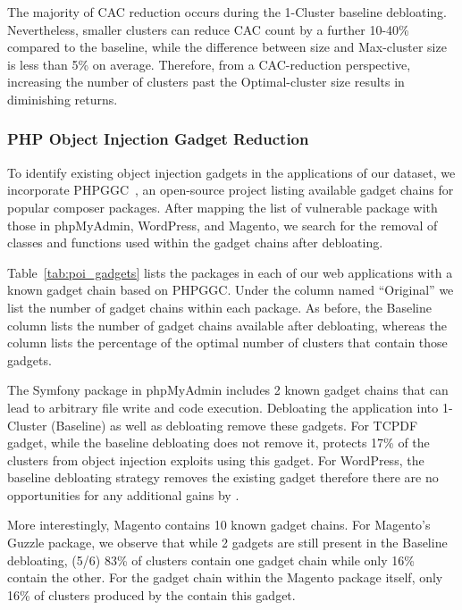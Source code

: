 The majority of CAC reduction occurs during the 1-Cluster baseline debloating. 
Nevertheless, smaller clusters can reduce CAC count by a further 10-40\% compared to the baseline, while the difference between \dbltr{} size and Max-cluster size is less than 5\% on average.
Therefore, from a CAC-reduction perspective, increasing the number of clusters past the Optimal-cluster size results in diminishing returns.

\subsubsection{PHP Object Injection Gadget Reduction}

To identify existing object injection gadgets in the applications of our dataset, we incorporate PHPGGC~\cite{PHPGGC}, an open-source project listing available gadget chains for popular composer packages. 
After mapping the list of vulnerable package with those in phpMyAdmin, WordPress, and Magento, we search for the removal of classes and functions used within the gadget chains after debloating. 

Table~\ref{tab:poi_gadgets} lists the packages in each of our web applications with a known gadget chain based on PHPGGC. 
Under the column named ``Original'' we list the number of gadget chains within each package. 
As before, the Baseline column lists the number of gadget chains available after debloating, whereas the \dbltr{} column lists the percentage of the optimal number of clusters that contain those gadgets. 

The Symfony package in phpMyAdmin includes 2 known gadget chains that can lead to arbitrary file write and code execution. 
Debloating the application into 1-Cluster (Baseline) as well as \dbltr{} debloating remove these gadgets. 
For TCPDF gadget, while the baseline debloating does not remove it, \dbltr{} protects 17\% of the clusters from object injection exploits using this gadget. 
For WordPress, the baseline debloating strategy removes the existing gadget therefore there are no opportunities for any additional gains by \dbltr{}.

More interestingly, Magento contains 10 known gadget chains. 
For Magento's Guzzle package, we observe that while 2 gadgets are still present in the Baseline debloating, (5/6) 83\% of clusters contain one gadget chain while only 16\% contain the other. 
For the gadget chain within the Magento package itself, only 16\% of clusters produced by the \dbltr{} contain this gadget. 

